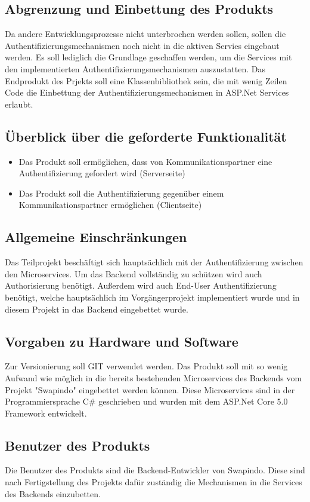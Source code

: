 \documentclass[14pt,a4paper]{extarticle}
\begin{document}
	\subsection{Abgrenzung und Einbettung des Produkts}
	Da andere Entwicklungsprozesse nicht unterbrochen werden sollen, sollen die Authentifizierungsmechanismen noch nicht in die aktiven Servies eingebaut werden.
	Es soll lediglich die Grundlage geschaffen werden, um die Services mit den implementierten Authentifizierungsmechanismen auszustatten.
	Das Endprodukt des Prjekts soll eine Klassenbibliothek sein, die mit wenig Zeilen Code die Einbettung der Authentifizierungsmechanismen in ASP.Net Services erlaubt.

	\subsection{Überblick über die geforderte Funktionalität}
	\begin{itemize}
		\item Das Produkt soll ermöglichen, dass von Kommunikationspartner eine Authentifizierung gefordert wird (Serverseite)
		\item Das Produkt soll die Authentifizierung gegenüber einem Kommunikationspartner ermöglichen (Clientseite)
	\end{itemize}

	\subsection{Allgemeine Einschränkungen}
	Das Teilprojekt beschäftigt sich hauptsächlich mit der Authentifizierung zwischen den Microservices.
	Um das Backend vollständig zu schützen wird auch Authorisierung benötigt.
	Außerdem wird auch End-User Authentifizierung benötigt, welche hauptsächlich im Vorgängerprojekt implementiert wurde und in diesem Projekt in das Backend eingebettet wurde.

	\subsection{Vorgaben zu Hardware und Software}
	Zur Versionierung soll GIT verwendet werden.
	Das Produkt soll mit so wenig Aufwand wie möglich in die bereits bestehenden Microservices des Backends vom Projekt "Swapindo" eingebettet werden können.
	Diese Microservices sind in der Programmiersprache C\# geschrieben und wurden mit dem ASP.Net Core 5.0 Framework entwickelt.

	\subsection{Benutzer des Produkts}
	Die Benutzer des Produkts sind die Backend-Entwickler von Swapindo.
	Diese sind nach Fertigstellung des Projekts dafür zuständig die Mechanismen in die Services des Backends einzubetten.
\end{document}
